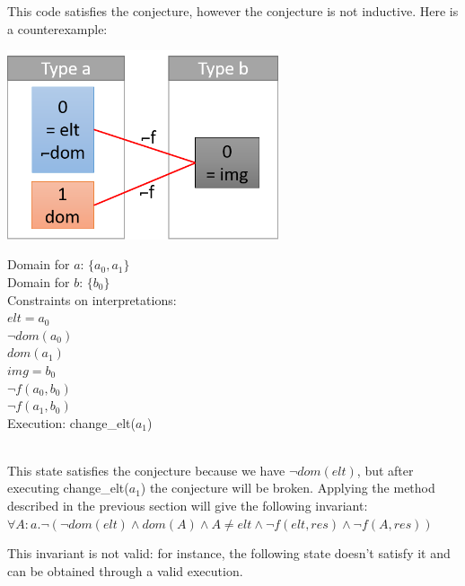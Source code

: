 \documentclass[11pt,a4paper,oldfontcommands]{memoir}
\begin{document}
    This code satisfies the conjecture, however the conjecture is not inductive. Here is a counterexample:\\

    \begin{minipage}{0.45\textwidth}
        \includegraphics[width=8cm]{NonMonotonicExCounterexample}
    \end{minipage} \hfill
    \begin{minipage}{0.45\textwidth}
        Domain for \(a\): \(\{a_0,a_1\}\)\\
        Domain for \(b\): \(\{b_0\}\)\\
        Constraints on interpretations:\\
        \(elt = a_0\)\\
        \(\neg dom(a_0)\)\\
        \(dom(a_1)\)\\
        \(img = b_0\)\\
        \(\neg f(a_0,b_0)\)\\
        \(\neg f(a_1,b_0)\)\\
        Execution: change_elt(\(a_1\))
    \end{minipage}\\

    This state satisfies the conjecture because we have \(\neg dom(elt)\), but after executing change_elt(\(a_1\)) the conjecture will be broken.
    Applying the method described in the previous section will give the following invariant:
    \(\forall A:a. \neg(\neg dom(elt) \land dom(A) \land A \neq elt \land \neg f(elt,res) \land \neg f(A,res))\)

    This invariant is not valid: for instance, the following state doesn't satisfy it and can be obtained through a valid execution.
\end{document}
